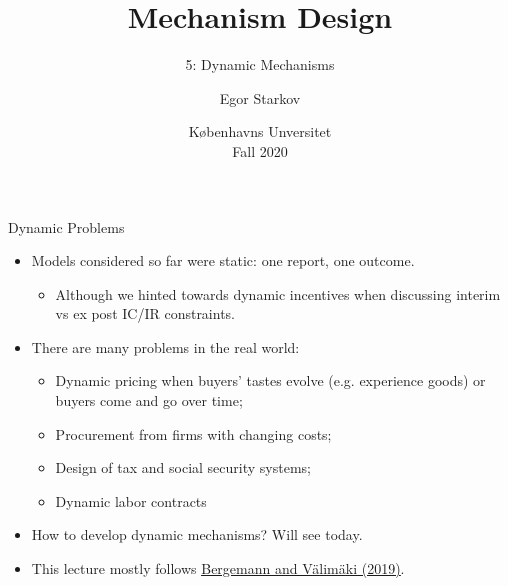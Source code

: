 \documentclass[english,10pt
,aspectratio=169
]{beamer}
\title{Mechanism Design}
\subtitle{5: Dynamic Mechanisms}
\author{Egor Starkov}
\date{K{\o}benhavns Unversitet \\
	Fall 2020}
\begin{document}
	\frame[plain]{\titlepage}



\begin{frame}{Dynamic Problems}
\begin{itemize}
	\item Models considered so far were static: one report, one outcome.
	\begin{itemize}
		\item Although we hinted towards dynamic incentives when discussing interim vs ex post IC/IR constraints.
	\end{itemize}
	\item There are many  problems in the real world:
	\begin{itemize}
		\item Dynamic pricing when buyers' tastes evolve (e.g. experience goods) or buyers come and go over time;
		\item Procurement from firms with changing costs;
		\item Design of tax and social security systems;
		\item Dynamic labor contracts
	\end{itemize}
	\item How to develop dynamic mechanisms? Will see today.
	\item This lecture mostly follows \href{https://www.aeaweb.org/articles?id=10.1257/jel.20180892}{\uline{Bergemann and V{\"a}lim{\"a}ki (2019)}}.
\end{itemize}
\end{frame}
\end{document}
